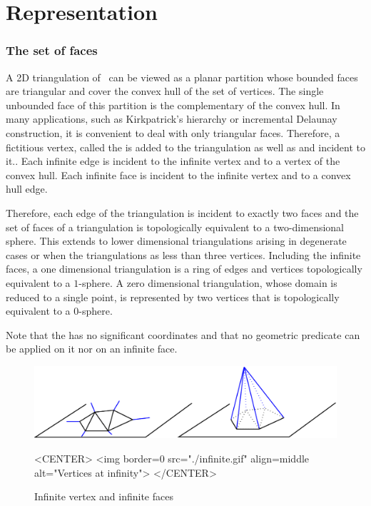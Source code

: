 \section{Representation\label{Section_2D_Triangulations_Representation}}

\subsubsection{The set of faces}

A 2D triangulation  of \cgal\ can be viewed as a planar partition 
whose bounded faces are triangular and cover
the convex hull of the set of vertices. 
The single unbounded face of this partition
is the complementary of the convex hull. 
In many applications, such as Kirkpatrick's hierarchy
or incremental Delaunay construction, it is convenient to
deal with only triangular faces. Therefore, 
a fictitious vertex, called the 
is added to the triangulation as well as
 and  incident to it..
Each infinite edge
is incident to the infinite vertex and to a vertex of the convex hull.
Each infinite face is incident to the infinite vertex
and to a convex hull edge. 

Therefore, each edge of the triangulation
is incident to exactly two faces
and the set of faces of a triangulation is topologically
equivalent to a two-dimensional sphere.
This extends to  lower dimensional triangulations
arising in degenerate cases or when the triangulations
as less than three vertices.
Including the infinite faces, 
a one dimensional triangulation
is a ring of edges and vertices
topologically equivalent to a $1$-sphere.
A zero dimensional triangulation, whose domain is reduced to a
single point, is represented by  two vertices that is
topologically equivalent to a $0$-sphere.

Note that
the  has no significant
coordinates and that no geometric predicate can be applied on it
nor on an infinite face.

\begin{figure}
\begin{ccTexOnly}
\begin{center}
\includegraphics{Triangulation_2/infinite} 
\end{center}
\end{ccTexOnly}

\begin{ccHtmlOnly}
<CENTER>
<img border=0 src="./infinite.gif" align=middle alt="Vertices at
infinity">
</CENTER>
\end{ccHtmlOnly}

\caption{Infinite vertex and infinite faces
\label{2D_Triangulation_Fig_infinite_vertex}}

\end{figure}




